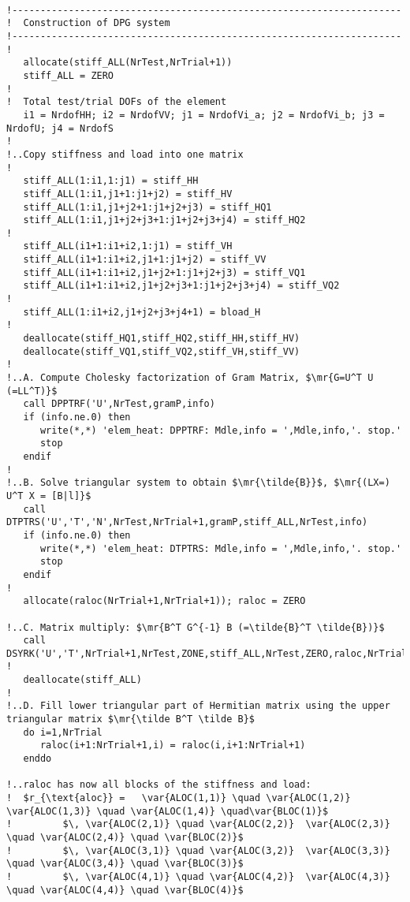 \begin{lstlisting}[mathescape,caption=\file{POISSON/ULTRAWEAK\_DPG/}\routine{elem}: constructing DPG linear system.]

!---------------------------------------------------------------------
!  Construction of DPG system
!---------------------------------------------------------------------
!
   allocate(stiff_ALL(NrTest,NrTrial+1))
   stiff_ALL = ZERO
!
!  Total test/trial DOFs of the element
   i1 = NrdofHH; i2 = NrdofVV; j1 = NrdofVi_a; j2 = NrdofVi_b; j3 = NrdofU; j4 = NrdofS
!
!..Copy stiffness and load into one matrix
!
   stiff_ALL(1:i1,1:j1) = stiff_HH
   stiff_ALL(1:i1,j1+1:j1+j2) = stiff_HV
   stiff_ALL(1:i1,j1+j2+1:j1+j2+j3) = stiff_HQ1
   stiff_ALL(1:i1,j1+j2+j3+1:j1+j2+j3+j4) = stiff_HQ2
!
   stiff_ALL(i1+1:i1+i2,1:j1) = stiff_VH
   stiff_ALL(i1+1:i1+i2,j1+1:j1+j2) = stiff_VV
   stiff_ALL(i1+1:i1+i2,j1+j2+1:j1+j2+j3) = stiff_VQ1
   stiff_ALL(i1+1:i1+i2,j1+j2+j3+1:j1+j2+j3+j4) = stiff_VQ2
!
   stiff_ALL(1:i1+i2,j1+j2+j3+j4+1) = bload_H
!
   deallocate(stiff_HQ1,stiff_HQ2,stiff_HH,stiff_HV)
   deallocate(stiff_VQ1,stiff_VQ2,stiff_VH,stiff_VV)
!
!..A. Compute Cholesky factorization of Gram Matrix, $\mr{G=U^T U (=LL^T)}$
   call DPPTRF('U',NrTest,gramP,info)
   if (info.ne.0) then
      write(*,*) 'elem_heat: DPPTRF: Mdle,info = ',Mdle,info,'. stop.'
      stop
   endif
!
!..B. Solve triangular system to obtain $\mr{\tilde{B}}$, $\mr{(LX=) U^T X = [B|l]}$
   call DTPTRS('U','T','N',NrTest,NrTrial+1,gramP,stiff_ALL,NrTest,info)
   if (info.ne.0) then
      write(*,*) 'elem_heat: DTPTRS: Mdle,info = ',Mdle,info,'. stop.'
      stop
   endif
!
   allocate(raloc(NrTrial+1,NrTrial+1)); raloc = ZERO

!..C. Matrix multiply: $\mr{B^T G^{-1} B (=\tilde{B}^T \tilde{B})}$
   call DSYRK('U','T',NrTrial+1,NrTest,ZONE,stiff_ALL,NrTest,ZERO,raloc,NrTrial+1)
!
   deallocate(stiff_ALL)
!
!..D. Fill lower triangular part of Hermitian matrix using the upper triangular matrix $\mr{\tilde B^T \tilde B}$
   do i=1,NrTrial
      raloc(i+1:NrTrial+1,i) = raloc(i,i+1:NrTrial+1)
   enddo
   
!..raloc has now all blocks of the stiffness and load:
!  $r_{\text{aloc}} =   \var{ALOC(1,1)} \quad \var{ALOC(1,2)}  \var{ALOC(1,3)} \quad \var{ALOC(1,4)} \quad\var{BLOC(1)}$
!         $\, \var{ALOC(2,1)} \quad \var{ALOC(2,2)}  \var{ALOC(2,3)} \quad \var{ALOC(2,4)} \quad \var{BLOC(2)}$
!         $\, \var{ALOC(3,1)} \quad \var{ALOC(3,2)}  \var{ALOC(3,3)} \quad \var{ALOC(3,4)} \quad \var{BLOC(3)}$
!         $\, \var{ALOC(4,1)} \quad \var{ALOC(4,2)}  \var{ALOC(4,3)} \quad \var{ALOC(4,4)} \quad \var{BLOC(4)}$
\end{lstlisting}